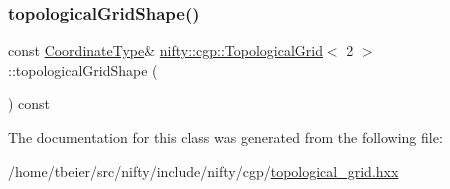 \subsubsection{\texorpdfstring{topological\+Grid\+Shape()}{topologicalGridShape()}}
{\footnotesize\ttfamily const \hyperlink{classnifty_1_1array_1_1ArrayExtender}{Coordinate\+Type}\& \hyperlink{classnifty_1_1cgp_1_1TopologicalGrid}{nifty\+::cgp\+::\+Topological\+Grid}$<$ 2 $>$\+::topological\+Grid\+Shape (\begin{DoxyParamCaption}{ }\end{DoxyParamCaption}) const\hspace{0.3cm}{\ttfamily [inline]}}



The documentation for this class was generated from the following file\+:\begin{DoxyCompactItemize}
\item 
/home/tbeier/src/nifty/include/nifty/cgp/\hyperlink{topological__grid_8hxx}{topological\+\_\+grid.\+hxx}\end{DoxyCompactItemize}
